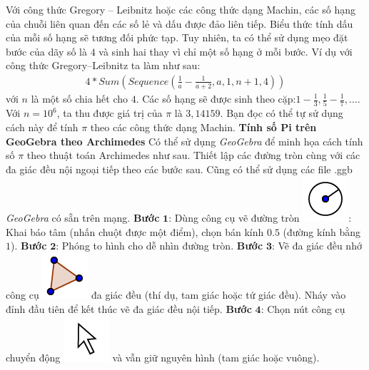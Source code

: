 \begin{multicols}{2}
	\vskip 0.1cm
	Với công thức Gregory -- Leibnitz hoặc các công thức dạng Machin, các số hạng của chuỗi liên quan đến các số lẻ và dấu được đảo liên tiếp. Biểu thức tính dấu của mỗi số hạng sẽ tương đối phức tạp. Tuy nhiên, ta có thể sử dụng mẹo đặt bước của dãy số là $4$ và sinh hai thay vì chỉ một số hạng ở mỗi bước. Ví dụ với công thức Gregory--Leibnitz ta làm như sau:
	\begin{align*}
		4*Sum\!\!\left(\!\! {Sequence\left(\!\! {\frac{1}{a}\! -\! \frac{1}{{a \!+\! 2}},a,1,n \!+\! 1,4} \!\!\right)}\!\! \right)
	\end{align*}
	với $n$ là một số chia hết cho $4$. Các số hạng sẽ được sinh theo cặp:$1 - \frac{1}{3}, \frac{1}{5} - \frac{1}{7}, \ldots$.
	\vskip 0.1cm  
	Với  $n = 10^6$, ta thu được giá trị của $\pi$  là $3{,}14159$. Bạn đọc có thể tự sử dụng cách này để tính  $\pi$  theo các công thức dạng Machin.
	\vskip 0.1cm
	\textbf{\color{lichsutoanhoc}Tính số Pi trên GeoGebra theo Archimedes}
	\vskip 0.1cm 
	Có thể sử dụng \textit{GeoGebra} để minh họa cách tính số $\pi$  theo thuật toán Archimedes như sau. Thiết lập các đường tròn cùng với các đa giác đều nội ngoại tiếp theo các bước sau. Cũng có thể sử dụng các file .ggb \textit{GeoGebra} có sẵn trên mạng.  
	\vskip 0.1cm
	\textbf{\color{lichsutoanhoc}Bước} $\pmb1$: Dùng công cụ vẽ đường tròn \includegraphics[scale =0.25]{6}: Khai báo tâm (nhấn chuột được một điểm), chọn bán kính $0.5$ (đường kính bằng $1$).
	\vskip 0.1cm 
	\textbf{\color{lichsutoanhoc}Bước} $\pmb{2}$: Phóng to hình cho dễ nhìn đường tròn.
	\vskip 0.1cm
	\textbf{\color{lichsutoanhoc}Bước} $\pmb{3}$: Vẽ đa giác đều nhớ công cụ \includegraphics[scale =0.25]{7} đa giác đều (thí dụ, tam giác hoặc tứ giác đều). Nháy vào đỉnh đầu tiên để kết thúc vẽ đa giác đều nội tiếp.
	\vskip 0.1cm
	\textbf{\color{lichsutoanhoc}Bước} $\pmb{4}$: Chọn nút công cụ chuyển động \includegraphics[scale =0.25]{8} và vẫn giữ nguyên hình (tam giác hoặc vuông).

\end{multicols}
